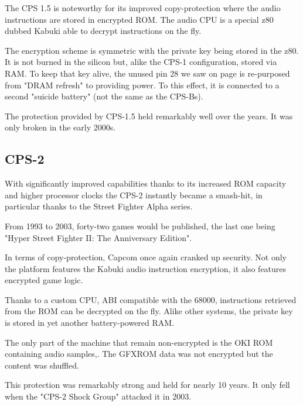 \label{kabuki}
The CPS 1.5 is noteworthy for its improved copy-protection where the audio instructions are stored in encrypted ROM. The audio CPU is a special z80 dubbed Kabuki\cite{arcadeHackerKabuki} able to decrypt instructions on the fly.

The encryption scheme is symmetric with the private key being stored in the z80. It is not burned in the silicon but, alike the CPS-1 configuration, stored via RAM. To keep that key alive, the unused pin 28 we saw on page \pageref{z80_pinRFSH} is re-purposed from "DRAM refresh" to providing power. To this effect, it is connected to a second "suicide battery" (not the same as the CPS-Bs). 





\begin{trivia}
The protection provided by CPS-1.5 held remarkably well over the years. It was only broken in the early 2000s\cite{mame_kabuki}.
\end{trivia}

\subsection{CPS-2}

With significantly improved capabilities thanks to its increased ROM capacity and higher processor clocks the CPS-2 instantly became a smash-hit, in particular thanks to the Street Fighter Alpha series. 

From 1993 to 2003, forty-two games would be published, the last one being "Hyper Street Fighter II: The Anniversary Edition".

In terms of copy-protection, Capcom once again cranked up security. Not only the platform features the Kabuki audio instruction encryption, it also features encrypted game logic. 

Thanks to a custom CPU, ABI compatible with the 68000, instructions retrieved from the ROM can be decrypted on the fly. Alike other systems, the private key is stored in yet another battery-powered RAM.

The only part of the machine that remain non-encrypted is the OKI ROM containing audio samples,. The GFXROM data was not encrypted but the content was shuffled.

\begin{trivia}
This protection was remarkably strong and held for nearly 10 years. It only fell when the "CPS-2 Shock Group" attacked it in 2003\cite{cps2rebirth}.
\end{trivia}



